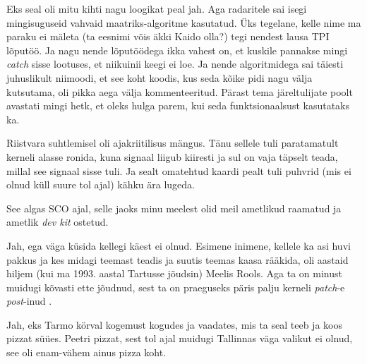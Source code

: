 Eks seal oli mitu kihti nagu loogikat peal jah. Aga radaritele sai isegi 
mingisuguseid vahvaid maatriks-algoritme kasutatud. Üks tegelane, kelle nime ma 
paraku ei mäleta (ta eesnimi võis äkki Kaido olla?) tegi nendest lausa TPI 
lõputöö. Ja nagu nende lõputöödega ikka vahest on, et kuskile pannakse mingi 
\emph{catch} sisse lootuses, et niikuinii keegi ei loe. Ja nende algoritmidega 
sai täiesti juhuslikult niimoodi, et see koht koodis, kus seda kõike pidi nagu 
välja kutsutama, oli pikka aega välja kommenteeritud. Pärast tema järeltulijate 
poolt avastati mingi hetk, et oleks hulga parem, kui seda funktsionaalsust 
kasutataks ka.
                 

Riistvara suhtlemisel oli ajakriitilisus mängus. Tänu sellele tuli paratamatult 
 kerneli alasse ronida, kuna signaal liigub kiiresti ja sul on vaja täpselt 
teada, millal see signaal sisse tuli. Ja sealt omatehtud kaardi pealt tuli 
puhvrid (mis ei olnud küll suure tol ajal)  kähku ära lugeda.


See algas SCO ajal,  selle jaoks minu meelest olid meil 
ametlikud raamatud ja ametlik \emph{dev kit} ostetud.
                 

Jah, ega väga küsida kellegi käest ei olnud. Esimene inimene, kellele ka asi 
huvi pakkus ja kes midagi teemast teadis ja suutis teemas kaasa rääkida, oli 
aastaid hiljem (kui ma 1993. aastal Tartusse jõudsin) Meelis 
Rools. Aga ta on minust muidugi kõvasti ette jõudnud, 
sest ta on praeguseks päris palju kerneli \emph{patch}-e \emph{post}-inud . 


Jah, eks Tarmo körval kogemust kogudes ja vaadates, mis ta seal teeb ja koos 
pizzat süües. Peetri pizzat, sest tol ajal muidugi Tallinnas väga valikut ei 
olnud, see oli enam-vähem ainus pizza koht. 


